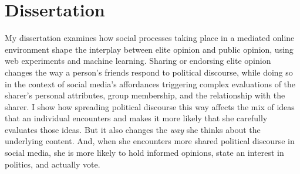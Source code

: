 \documentclass[12pt]{article}
\begin{document}

\section*{Dissertation}
My dissertation examines how social processes taking place in a mediated online environment shape the interplay between elite opinion and public opinion, using web experiments and machine learning.  Sharing or endorsing elite opinion changes the way a person's friends respond to political discourse, while doing so in the context of social media's affordances triggering complex evaluations of the sharer's personal attributes, group membership, and the relationship with the sharer.  I show how spreading political discourse this way affects the mix of ideas that an individual encounters and makes it more likely that she carefully evaluates those ideas.  But it also changes the \emph{way} she thinks about the underlying content.  And, when she encounters more shared political discourse in social media, she is more likely to hold informed opinions, state an interest in politics, and actually vote.  




\end{document}
